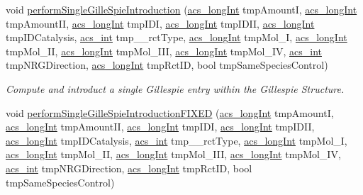 \begin{DoxyCompactItemize}
void \hyperlink{a00003_a30a0827eed2860d03d5fa5318fcf86b0}{perform\-Single\-Gille\-Spie\-Introduction} (\hyperlink{a00016_a19319d75f02db4308bc5c0026d98cd85}{acs\-\_\-long\-Int} tmp\-Amount\-I, \hyperlink{a00016_a19319d75f02db4308bc5c0026d98cd85}{acs\-\_\-long\-Int} tmp\-Amount\-I\-I, \hyperlink{a00016_a19319d75f02db4308bc5c0026d98cd85}{acs\-\_\-long\-Int} tmp\-I\-D\-I, \hyperlink{a00016_a19319d75f02db4308bc5c0026d98cd85}{acs\-\_\-long\-Int} tmp\-I\-D\-I\-I, \hyperlink{a00016_a19319d75f02db4308bc5c0026d98cd85}{acs\-\_\-long\-Int} tmp\-I\-D\-Catalysis, \hyperlink{a00016_a8d277355641a098190360234e2ebde35}{acs\-\_\-int} tmp\-\_\-\-\_\-rct\-Type, \hyperlink{a00016_a19319d75f02db4308bc5c0026d98cd85}{acs\-\_\-long\-Int} tmp\-Mol\-\_\-\-I, \hyperlink{a00016_a19319d75f02db4308bc5c0026d98cd85}{acs\-\_\-long\-Int} tmp\-Mol\-\_\-\-I\-I, \hyperlink{a00016_a19319d75f02db4308bc5c0026d98cd85}{acs\-\_\-long\-Int} tmp\-Mol\-\_\-\-I\-I\-I, \hyperlink{a00016_a19319d75f02db4308bc5c0026d98cd85}{acs\-\_\-long\-Int} tmp\-Mol\-\_\-\-I\-V, \hyperlink{a00016_a8d277355641a098190360234e2ebde35}{acs\-\_\-int} tmp\-N\-R\-G\-Direction, \hyperlink{a00016_a19319d75f02db4308bc5c0026d98cd85}{acs\-\_\-long\-Int} tmp\-Rct\-I\-D, bool tmp\-Same\-Species\-Control)
\begin{DoxyCompactList}\small\item\em Compute and introduct a single Gillespie entry within the Gillespie Structure. \end{DoxyCompactList}\item 
void \hyperlink{a00003_a4ebb93b149e9ac023661f74657f634c7}{perform\-Single\-Gille\-Spie\-Introduction\-F\-I\-X\-E\-D} (\hyperlink{a00016_a19319d75f02db4308bc5c0026d98cd85}{acs\-\_\-long\-Int} tmp\-Amount\-I, \hyperlink{a00016_a19319d75f02db4308bc5c0026d98cd85}{acs\-\_\-long\-Int} tmp\-Amount\-I\-I, \hyperlink{a00016_a19319d75f02db4308bc5c0026d98cd85}{acs\-\_\-long\-Int} tmp\-I\-D\-I, \hyperlink{a00016_a19319d75f02db4308bc5c0026d98cd85}{acs\-\_\-long\-Int} tmp\-I\-D\-I\-I, \hyperlink{a00016_a19319d75f02db4308bc5c0026d98cd85}{acs\-\_\-long\-Int} tmp\-I\-D\-Catalysis, \hyperlink{a00016_a8d277355641a098190360234e2ebde35}{acs\-\_\-int} tmp\-\_\-\-\_\-rct\-Type, \hyperlink{a00016_a19319d75f02db4308bc5c0026d98cd85}{acs\-\_\-long\-Int} tmp\-Mol\-\_\-\-I, \hyperlink{a00016_a19319d75f02db4308bc5c0026d98cd85}{acs\-\_\-long\-Int} tmp\-Mol\-\_\-\-I\-I, \hyperlink{a00016_a19319d75f02db4308bc5c0026d98cd85}{acs\-\_\-long\-Int} tmp\-Mol\-\_\-\-I\-I\-I, \hyperlink{a00016_a19319d75f02db4308bc5c0026d98cd85}{acs\-\_\-long\-Int} tmp\-Mol\-\_\-\-I\-V, \hyperlink{a00016_a8d277355641a098190360234e2ebde35}{acs\-\_\-int} tmp\-N\-R\-G\-Direction, \hyperlink{a00016_a19319d75f02db4308bc5c0026d98cd85}{acs\-\_\-long\-Int} tmp\-Rct\-I\-D, bool tmp\-Same\-Species\-Control)

\end{DoxyCompactItemize}

